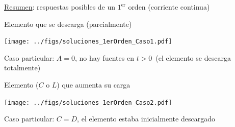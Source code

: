 \documentclass[aspectratio=169, usenames,svgnames,dvipsnames]{beamer}
\begin{document}
\begin{frame}{\underline{Resumen}: \hspace{3mm}respuestas posibles de un $1^{\textrm{er}}$ orden \hspace{3mm}(corriente continua)}

\vspace{3mm}
    \begin{minipage}[c]{0.47\linewidth} 

        Elemento que se \alert{descarga} (parcialmente)        

        \vspace{3mm}
        \texttt{[image: ../figs/soluciones\_1erOrden\_Caso1.pdf]}

        \vspace{3mm}
        \alert{Caso particular}: \hyperlink{diapo:RC_resultado}{$A=0$}, no hay fuentes en $t>0 \,$ (el elemento se \alert{descarga totalmente})
    \end{minipage}
    \hfill
    \vrule
    \hfill
    \begin{minipage}{0.47\linewidth} 
        Elemento ($C$ o $L$) que \alert{aumenta su carga} 
        
        \vspace{3mm}
        \texttt{[image: ../figs/soluciones\_1erOrden\_Caso2.pdf]}
        
        \vspace{3mm}
        \alert{Caso particular}: \hyperlink{diapo:RL_resultado}{$C=D$}, el elemento %
        estaba \alert{inicialmente descargado}
    \end{minipage}


\end{frame}
\end{document}
